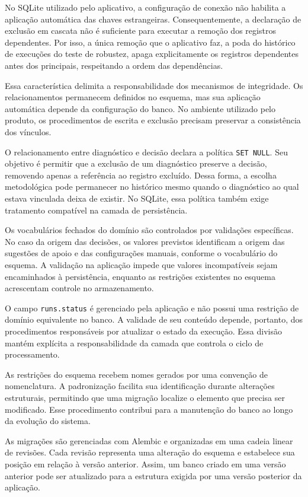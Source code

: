 No SQLite utilizado pelo aplicativo, a configuração de conexão não habilita a aplicação automática das chaves estrangeiras. Consequentemente, a declaração de exclusão em cascata não é suficiente para executar a remoção dos registros dependentes. Por isso, a única remoção que o aplicativo faz, a poda do histórico de execuções do teste de robustez, apaga explicitamente os registros dependentes antes dos principais, respeitando a ordem das dependências.

Essa característica delimita a responsabilidade dos mecanismos de integridade. Os relacionamentos permanecem definidos no esquema, mas sua aplicação automática depende da configuração do banco. No ambiente utilizado pelo produto, os procedimentos de escrita e exclusão precisam preservar a consistência dos vínculos.

O relacionamento entre diagnóstico e decisão declara a política \texttt{SET NULL}. Seu objetivo é permitir que a exclusão de um diagnóstico preserve a decisão, removendo apenas a referência ao registro excluído. Dessa forma, a escolha metodológica pode permanecer no histórico mesmo quando o diagnóstico ao qual estava vinculada deixa de existir. No SQLite, essa política também exige tratamento compatível na camada de persistência.

Os vocabulários fechados do domínio são controlados por validações específicas. No caso da origem das decisões, os valores previstos identificam a origem das sugestões de apoio e das configurações manuais, conforme o vocabulário do esquema. A validação na aplicação impede que valores incompatíveis sejam encaminhados à persistência, enquanto as restrições existentes no esquema acrescentam controle no armazenamento.

O campo \texttt{runs.status} é gerenciado pela aplicação e não possui uma restrição de domínio equivalente no banco. A validade de seu conteúdo depende, portanto, dos procedimentos responsáveis por atualizar o estado da execução. Essa divisão mantém explícita a responsabilidade da camada que controla o ciclo de processamento.

As restrições do esquema recebem nomes gerados por uma convenção de nomenclatura. A padronização facilita sua identificação durante alterações estruturais, permitindo que uma migração localize o elemento que precisa ser modificado. Esse procedimento contribui para a manutenção do banco ao longo da evolução do sistema.

As migrações são gerenciadas com Alembic e organizadas em uma cadeia linear de revisões. Cada revisão representa uma alteração do esquema e estabelece sua posição em relação à versão anterior. Assim, um banco criado em uma versão anterior pode ser atualizado para a estrutura exigida por uma versão posterior da aplicação.

